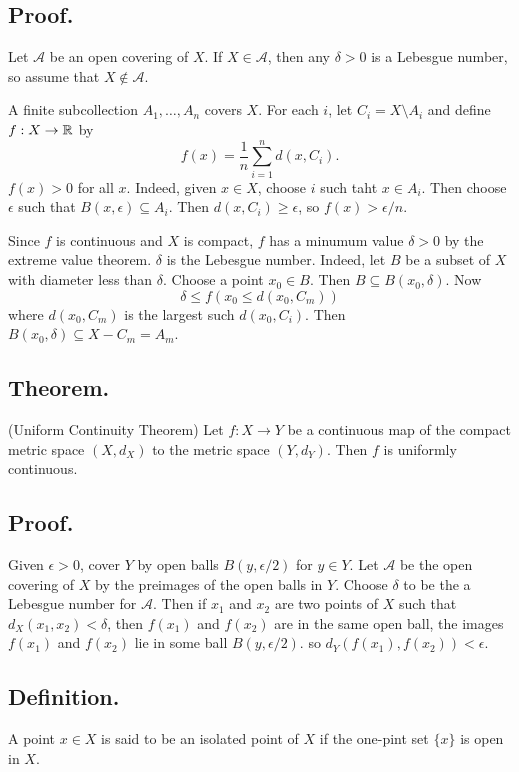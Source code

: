 \documentclass[titlepage]{article}
\begin{document}
\subsection{Proof.} Let $\mathcal{A}$ be an open covering of $X$. If $X \in \mathcal{A}$, then any $\delta > 0$ is a Lebesgue number, so assume that $X \not\in \mathcal{A}$.

A finite subcollection $A_{1}, \ldots, A_{n}$ covers $X$. For each $i$, let $C_{i} = X \setminus A_{i}$ and define $f: X \to \mathbb{R}$ by 
$$f(x) = \frac{1}{n} \sum_{i=1}^{n} d(x, C_{i}).$$
$f(x) > 0$ for all $x$. Indeed, given $x \in X$, choose $i$ such taht $x \in A_{i}$. Then choose $\epsilon$ such that $B(x, \epsilon) \subseteq A_{i}$. Then $d(x, C_{i}) \geq \epsilon$, so $f(x) > \epsilon/n$.

Since $f$ is continuous and $X$ is compact, $f$ has a minumum value $\delta > 0$ by the extreme value theorem. $\delta$ is the Lebesgue number. Indeed, let $B$ be a subset of $X$ with diameter less than $\delta$. Choose a point $x_{0} \in B$. Then $B \subseteq B(x_{0}, \delta)$. Now 
$$\delta \leq f(x_{0} \leq d(x_{0}, C_{m}))$$
where $d(x_{0}, C_{m})$ is the largest such $d(x_{0}, C_{i})$. Then $B(x_{0}, \delta) \subseteq X - C_{m} = A_{m}$.

\subsection{Theorem.} (Uniform Continuity Theorem) Let $f: X \to Y$ be a continuous map of the compact metric space $(X, d_{X})$ to the metric space $(Y, d_{Y})$. Then $f$ is uniformly continuous.

\subsection{Proof.} Given $\epsilon > 0$, cover $Y$ by open balls $B(y, \epsilon/2)$ for $y \in Y$. Let $\mathcal{A}$ be the open covering of $X$ by the preimages of the open balls in $Y$. Choose $\delta$ to be the a Lebesgue number for $\mathcal{A}$. Then if $x_{1}$ and $x_{2}$ are two points of $X$ such that $d_{X}(x_{1}, x_{2}) < \delta$, then $f(x_{1})$ and $f(x_{2})$ are in the same open ball, the images $f(x_{1})$ and $f(x_{2})$ lie in some ball $B(y, \epsilon/2)$. so $d_{Y}(f(x_{1}), f(x_{2})) < \epsilon$.

\subsection{Definition.} A point $x \in X$ is said to be an isolated point of $X$ if the one-pint set $\{x\}$ is open in $X$.
\end{document}

